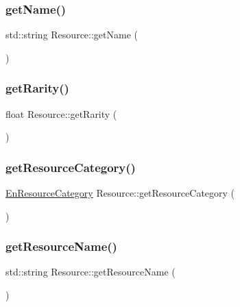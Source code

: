 \subsubsection{\texorpdfstring{get\+Name()}{getName()}}
{\footnotesize\ttfamily std\+::string Resource\+::get\+Name (\begin{DoxyParamCaption}{ }\end{DoxyParamCaption})}

\mbox{\label{class_resource_ad08704ca1b53b09a0f7e84933c23b100}} 
\subsubsection{\texorpdfstring{get\+Rarity()}{getRarity()}}
{\footnotesize\ttfamily float Resource\+::get\+Rarity (\begin{DoxyParamCaption}{ }\end{DoxyParamCaption})}

\mbox{\label{class_resource_abe11e435e757baea37ca3dde8e01937a}} 
\subsubsection{\texorpdfstring{get\+Resource\+Category()}{getResourceCategory()}}
{\footnotesize\ttfamily \mbox{\hyperlink{_resource_8hpp_abde177ff256dcb25ea4a492ad7335b82}{En\+Resource\+Category}} Resource\+::get\+Resource\+Category (\begin{DoxyParamCaption}{ }\end{DoxyParamCaption})}

\mbox{\label{class_resource_a96943da326e03738d7adfa378f733f2e}} 
\subsubsection{\texorpdfstring{get\+Resource\+Name()}{getResourceName()}}
{\footnotesize\ttfamily std\+::string Resource\+::get\+Resource\+Name (\begin{DoxyParamCaption}{ }\end{DoxyParamCaption})}


